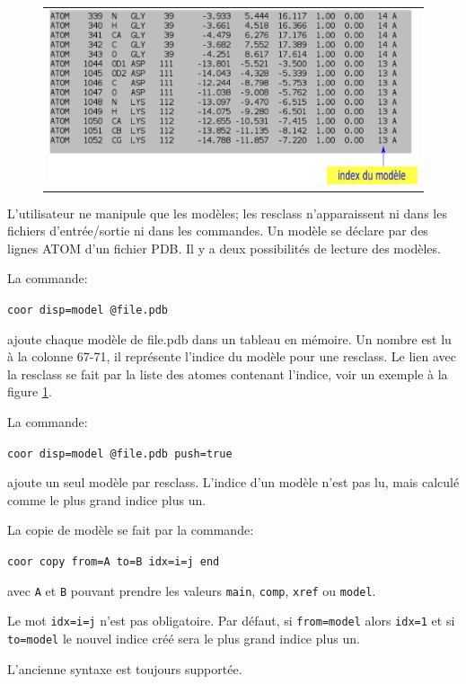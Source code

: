    \begin{figure}[!htbp]
     \centering
     \begin{tabular}{c}
       \includegraphics[width=12cm]{figure/PDB.png} 
     \end{tabular}     
     \caption{\textbt{}}
\label{fig:PDB}
   \end{figure}


L'utilisateur ne manipule que les modèles; les resclass n'apparaissent ni dans les fichiers d'entrée/sortie ni dans les commandes. Un modèle se déclare par des lignes ATOM d'un fichier PDB. 
Il y a deux possibilités de lecture des modèles.

La commande:

\verb!coor disp=model @file.pdb!

ajoute chaque modèle de file.pdb dans un tableau en mémoire. Un nombre est lu à la colonne 67-71, il représente l'indice du modèle pour une resclass. Le lien avec la resclass se fait par la liste des atomes contenant l'indice, voir un exemple à la figure \ref{fig:PDB}.

La commande:

\verb!coor disp=model @file.pdb push=true!

ajoute un seul modèle par resclass. L'indice d'un modèle n'est pas lu, mais calculé comme le plus grand indice plus un. 

La copie de modèle se fait par la commande:

\verb!coor copy from=A to=B idx=i=j end!

avec \verb!A! et \verb!B!  pouvant prendre les valeurs \verb!main!, \verb!comp!, \verb!xref! ou \verb!model!.

Le mot \verb!idx=i=j! n'est pas obligatoire. Par défaut, si \verb!from=model! alors \verb!idx=1! et si \verb!to=model!  le nouvel indice créé sera le plus grand indice plus un.

L'ancienne syntaxe est toujours supportée.

